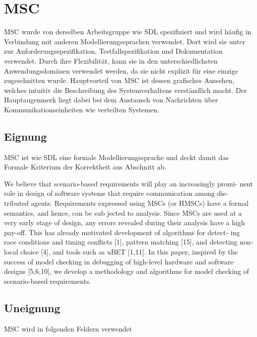 \section{MSC}
\label{sc:MSCB}
\ac{MSC} wurde von derselben Arbeitsgruppe wie \ac{SDL} spezifiziert und wird häufig in Verbindung mit anderen Modellierungssprachen verwendet. Dort wird sie unter zur Anforderungsspezifikation, Testfallspezifikation und Dokumentation verwendet. Durch ihre Flexibilität, kann sie in den unterschiedlichsten Anwendungsdomänen verwendet werden, da sie nicht explizit für eine einzige zugeschnitten wurde. Hauptvorteil von \ac{MSC} ist dessen grafisches Aussehen, welches intuitiv die Beschreibung des Systemverhaltens verständlich macht. Der Hauptaugenmerk liegt dabei bei dem Austausch von Nachrichten über Kommunikationseinheiten wie verteilten Systemen.
\subsection{Eignung}
\label{sc:MSCEignung}
\ac{MSC} ist wie \ac{SDL} eine formale Modellierungssprache und deckt damit das Formale Kriterium der Korrektheit aus Abschnitt \pageref{ssc:Korrektheit} ab. 


We believe that scenario-based requirements will play an increasingly promi-
nent role in design of software systems that require communication among dis-
tributed agents. Requirements expressed using MSCs (or HMSCs) have a formal
semantics, and hence, can be sub jected to analysis. Since MSCs are used at
a very early stage of design, any errors revealed during their analysis have a
high pay-off. This has already motivated development of algorithms for detect-
ing race conditions and timing conﬂicts [1], pattern matching [15], and detecting
non-local choice [4], and tools such as uBET [1,11]. In this paper, inspired by
the success of model checking in debugging of high-level hardware and software
designs [5,6,10], we develop a methodology and algorithms for model checking
of scenario-based requirements.
\subsection{Uneignung}
\label{sc:MSCUnEignung}


MSC wird in folgenden Feldern verwendet
